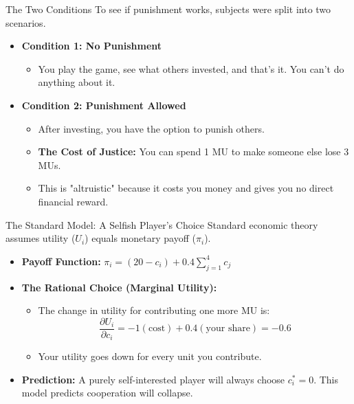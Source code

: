 \documentclass{beamer}
\begin{document}
\begin{frame}{The Two Conditions}
    To see if punishment works, subjects were split into two scenarios.
    \begin{itemize}
        \item<1-> \textbf{Condition 1: No Punishment}
        \begin{itemize}
            \item You play the game, see what others invested, and that's it. You can't do anything about it.
        \end{itemize}
        \pause
        \item<2-> \textbf{Condition 2: Punishment Allowed}
        \begin{itemize}
            \item After investing, you have the option to punish others.
            \item \textbf{The Cost of Justice:} You can spend 1 MU to make someone else lose 3 MUs.
            \item This is "altruistic" because it costs you money and gives you no direct financial reward.
        \end{itemize}
    \end{itemize}
\end{frame}

\begin{frame}{The Standard Model: A Selfish Player's Choice}
    Standard economic theory assumes utility ($U_i$) equals monetary payoff ($\pi_i$).
    
    \begin{itemize}
        \item<1-> \textbf{Payoff Function:} $\pi_i = (20 - c_i) + 0.4 \sum_{j=1}^{4} c_j$
        \pause
        \item<2-> \textbf{The Rational Choice (Marginal Utility):}
        \begin{itemize}
            \item The change in utility for contributing one more MU is:
            \[ \frac{\partial U_i}{\partial c_i} = -1 (\text{cost}) + 0.4 (\text{your share}) = -0.6 \]
            \item Your utility goes down for every unit you contribute.
        \end{itemize}
        \pause
        \item<3-> \textbf{Prediction:} A purely self-interested player will always choose $c_i^* = 0$. This model predicts cooperation will collapse.
    \end{itemize}
\end{frame}
\end{document}
